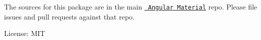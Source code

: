The sources for this package are in the main \href{https://github.com/angular/components}{\texttt{ Angular Material}} repo. Please file issues and pull requests against that repo.

License\+: MIT 